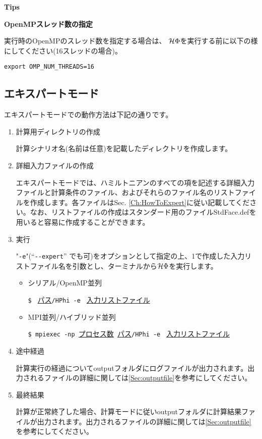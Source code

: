 \begin{screen}
\Large 
{\bf Tips}
\normalsize

{\bf OpenMPスレッド数の指定}

実行時のOpenMPのスレッド数を指定する場合は、
$\mathcal{H} \Phi$を実行する前に以下の様にしてください(16スレッドの場合)。
\begin{verbatim}
export OMP_NUM_THREADS=16
\end{verbatim}

\end{screen}

\newpage
\subsection{エキスパートモード}
エキスパートモードでの動作方法は下記の通りです。

 \begin{enumerate}
   \item  計算用ディレクトリの作成

計算シナリオ名(名前は任意)を記載したディレクトリを作成します。

   \item  詳細入力ファイルの作成

エキスパートモードでは、ハミルトニアンのすべての項を記述する詳細入力ファイルと計算条件のファイル、およびそれらのファイル名のリストファイルを作成します。各ファイルはSec. \ref{Ch:HowToExpert}に従い記載してください。なお、リストファイルの作成はスタンダード用のファイルStdFace.defを用いると容易に作成することができます。

 \item  実行

"\verb|-e|"(``\verb|--expert|'' でも可)をオプションとして指定の上、1で作成した入力リストファイル名を引数とし、ターミナルから$\mathcal{H} \Phi$を実行します。

\begin{itemize}

\item シリアル/OpenMP並列

\verb|$ | \underline{パス}\verb|/HPhi -e | \underline{入力リストファイル} 

\item MPI並列/ハイブリッド並列

\verb|$ mpiexec -np |\underline{プロセス数}\verb| |\underline{パス}\verb|/HPhi -e | \underline{入力リストファイル}


\end{itemize}

\item 途中経過

計算実行の経過についてoutputフォルダにログファイルが出力されます。出力されるファイルの詳細に関しては\ref{Sec:outputfile}を参考にしてください。

\item 最終結果

計算が正常終了した場合、計算モードに従いoutputフォルダに計算結果ファイルが出力されます。出力されるファイルの詳細に関しては\ref{Sec:outputfile}を参考にしてください。
\end{enumerate}

